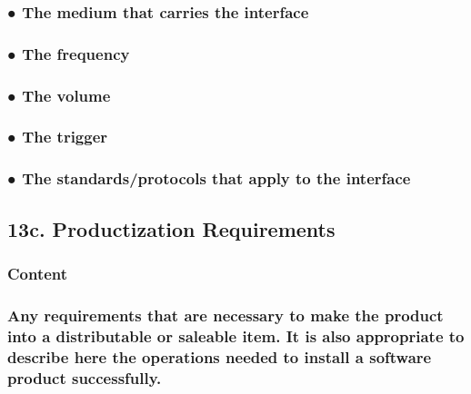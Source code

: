\documentclass[
]{article}
\begin{document}
\hypertarget{the-medium-that-carries-the-interface}{%
\subsubsection{● The medium that carries the
interface}\label{the-medium-that-carries-the-interface}}

\hypertarget{the-frequency}{%
\subsubsection{● The frequency}\label{the-frequency}}

\hypertarget{the-volume}{%
\subsubsection{● The volume}\label{the-volume}}

\hypertarget{the-trigger}{%
\subsubsection{● The trigger}\label{the-trigger}}

\hypertarget{the-standardsprotocols-that-apply-to-the-interface}{%
\subsubsection{● The standards/protocols that apply to the
interface}\label{the-standardsprotocols-that-apply-to-the-interface}}

\hypertarget{c.-productization-requirements}{%
\subsection{13c. Productization
Requirements}\label{c.-productization-requirements}}

\hypertarget{content-47}{%
\subsubsection{Content}\label{content-47}}

\hypertarget{any-requirements-that-are-necessary-to-make-the-product-into-a-distributable-or-saleable-item.-it-is-also-appropriate-to-describe-here-the-operations-needed-to-install-a-software-product-successfully.}{%
\subsubsection{\texorpdfstring{Any requirements that are necessary to
make the product into a distributable or saleable item. It is also
appropriate to describe here the operations needed to install a software
product successfully.
}{Any requirements that are necessary to make the product into a distributable or saleable item. It is also appropriate to describe here the operations needed to install a software product successfully. }}\label{any-requirements-that-are-necessary-to-make-the-product-into-a-distributable-or-saleable-item.-it-is-also-appropriate-to-describe-here-the-operations-needed-to-install-a-software-product-successfully.}}
\end{document}
